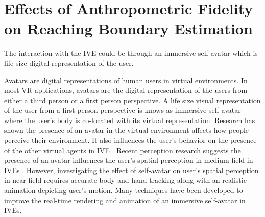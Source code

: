 
\chapter{Effects of Anthropometric Fidelity on Reaching Boundary Estimation}


The interaction with the IVE could be through an immersive self-avatar which is life-size digital representation of the user. 

Avatars are digital representations of human users in virtual environments. In most VR applications, avatars are the digital representation of the users from either a third person or a first person perspective. A life size visual representation of the user from a first person perspective is knows as immersive self-avatar where the user's body is co-located with its virtual representation. Research has shown the presence of an avatar in the virtual environment affects how people perceive their environment. It also influences the user's behavior on the presence of the other virtual agents in IVE \cite{HUH10,SAD+06,ZUG+07}. Recent perception research suggests the presence of an avatar influences the user's spatial perception in medium field in IVEs \cite{MCW+10,LNW+03,WJS+08}. However, investigating the effect of self-avatar on user's spatial perception in near-field requires accurate body and hand tracking along with an realistic animation depicting user's motion. Many techniques have been developed to improve the real-time rendering and animation of an immersive self-avatar in IVEs. 






